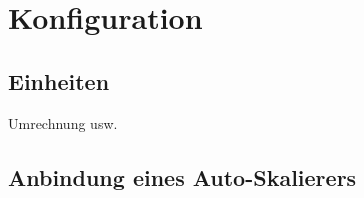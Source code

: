 \chapter{Konfiguration}
\label{ch:Konfiguration}

\section{Einheiten}
Umrechnung usw.


\section{Anbindung eines Auto-Skalierers}
\label{sec:Konfiguration:AnbindungScaler}



